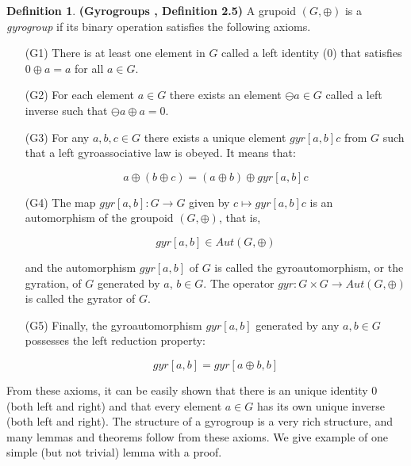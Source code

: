 \documentclass[a4paper]{article}
\theoremstyle{definition}
\newtheorem{definition}{Definition}[section]
\begin{document}
\begin{definition} \textbf{(Gyrogroups \cite{ungar-analytic},
    Definition 2.5)} A grupoid $(G, \oplus)$ is a \emph{gyrogroup} if
  its binary operation satisfies the following axioms.
\begin{itemize}
\item[(G1)] There is at least one element in $G$ called a left
  identity ($0$) that satisfies $0\oplus a = a$ for all $a\in G$.
  
\item[(G2)] For each element $a\in G$ there exists an element
  $\ominus a\in G$ called a left inverse such that
  $\ominus a \oplus a = 0$.
  
\item[(G3)] For any $a, b, c \in G$ there exists a unique element
  $gyr[a,b]c$ from $G$ such that a left gyroassociative law is
  obeyed. It means that:
  
  $$a\oplus (b \oplus c) = (a\oplus b) \oplus gyr[a,b]c$$
  
\item[(G4)] The map $gyr[a, b] : G \rightarrow G$ given by
  $c \mapsto gyr[a, b]c$ is an automorphism of the groupoid
  $(G, \oplus)$, that is,

  $$gyr[a, b] \in Aut(G, \oplus)$$
  
  and the automorphism $gyr[a, b]$ of $G$ is called the
  gyroautomorphism, or the gyration, of $G$ generated by $a$,
  $b \in G$. The operator
  $gyr : G \times G \rightarrow Aut(G, \oplus)$ is called the gyrator
  of $G$.
\item[(G5)] Finally, the gyroautomorphism $gyr[a, b]$ generated by any
  $a, b \in G$ possesses the left reduction property:
  
  $$gyr[a, b] = gyr[a\oplus b, b]$$ 
\end{itemize}
\end{definition}

From these axioms, it can be easily shown that there is an unique
identity $0$ (both left and right) and that every element $a\in G$ has
its own unique inverse (both left and right). The structure of a
gyrogroup is a very rich structure, and many lemmas and theorems
follow from these axioms. We give example of one simple (but not
trivial) lemma with a proof.
\end{document}
